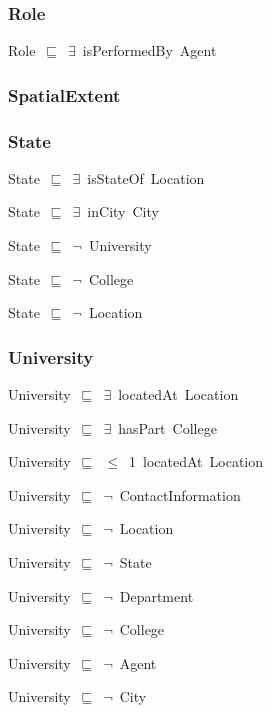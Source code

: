 \documentclass{article}
\begin{document}
\subsubsection*{Role}

Role~\ensuremath{\sqsubseteq}~\ensuremath{\exists}~isPerformedBy~Agent~

\subsubsection*{SpatialExtent}

\subsubsection*{State}

State~\ensuremath{\sqsubseteq}~\ensuremath{\exists}~isStateOf~Location~

State~\ensuremath{\sqsubseteq}~\ensuremath{\exists}~inCity~City~

State~\ensuremath{\sqsubseteq}~\ensuremath{\lnot}~University

State~\ensuremath{\sqsubseteq}~\ensuremath{\lnot}~College

State~\ensuremath{\sqsubseteq}~\ensuremath{\lnot}~Location

\subsubsection*{University}

University~\ensuremath{\sqsubseteq}~\ensuremath{\exists}~locatedAt~Location~

University~\ensuremath{\sqsubseteq}~\ensuremath{\exists}~hasPart~College~

University~\ensuremath{\sqsubseteq}~\ensuremath{\leq}~1~locatedAt~Location~

University~\ensuremath{\sqsubseteq}~\ensuremath{\lnot}~ContactInformation

University~\ensuremath{\sqsubseteq}~\ensuremath{\lnot}~Location

University~\ensuremath{\sqsubseteq}~\ensuremath{\lnot}~State

University~\ensuremath{\sqsubseteq}~\ensuremath{\lnot}~Department

University~\ensuremath{\sqsubseteq}~\ensuremath{\lnot}~College

University~\ensuremath{\sqsubseteq}~\ensuremath{\lnot}~Agent

University~\ensuremath{\sqsubseteq}~\ensuremath{\lnot}~City
\end{document}
